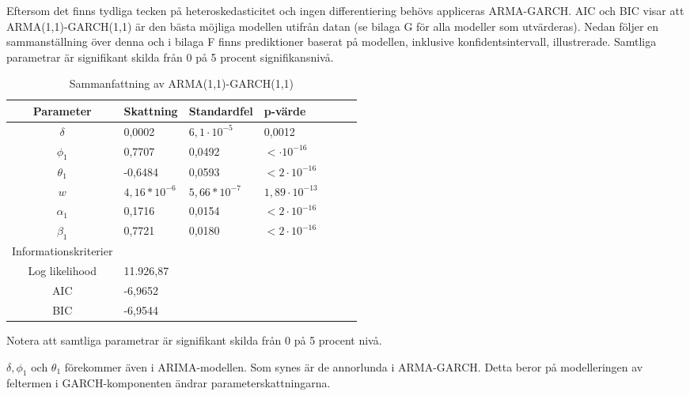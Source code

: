 \documentclass[11pt]{article}
\numberwithin{equation}{section}
\numberwithin{table}{section}
\numberwithin{figure}{section}
\begin{document}
Eftersom det finns tydliga tecken på heteroskedasticitet och ingen differentiering behövs appliceras ARMA-GARCH. AIC och BIC visar att ARMA(1,1)-GARCH(1,1) är den bästa möjliga modellen utifrån datan (se bilaga G för alla modeller som utvärderas). Nedan följer en sammanställning över denna och i bilaga F finns prediktioner baserat på modellen, inklusive konfidentsintervall, illustrerade. Samtliga parametrar är signifikant skilda från 0 på 5 procent signifikansnivå.

\begin{table}[H]
\caption{Sammanfattning av ARMA(1,1)-GARCH(1,1)}
\begin{tabularx}{\textwidth}{c *{6}{Y}}
\toprule
Parameter  & Skattning & Standardfel & p-värde \\
\hline

$\delta$      & 0,0002         & $6,1\cdot10^{-5}$ & 0,0012           \\
$\phi_1$      & 0,7707         & 0,0492         & $<\cdot10^{-16}$    \\

$\theta_1$    & -0,6484        & 0,0593         & $<2\cdot10^{-16}$    \\
$w$           & $4,16*10^{-6}$ & $5,66*10^{-7}$ & $1,89\cdot10^{-13}$  \\

$\alpha_1$    & 0,1716         & 0,0154         & $<2\cdot10^{-16}$    \\
$\beta_1$     & 0,7721         & 0,0180         & $<2\cdot10^{-16}$    \\ 
\midrule

Informationskriterier  & &  &  \\
\hline

Log likelihood & 11.926,87       &                &                  \\
AIC            & -6,9652        &                &                   \\

BIC            & -6,9544         &                &                   \\
\bottomrule
\end{tabularx}
\footnotesize{Notera att samtliga parametrar är signifikant skilda från 0 på 5 procent nivå.}
\end{table}






$\delta, \phi_1$ och $\theta_1$ förekommer även i ARIMA-modellen. Som synes är de annorlunda i ARMA-GARCH. Detta beror på modelleringen av feltermen i GARCH-komponenten ändrar parameterskattningarna.
\end{document}
